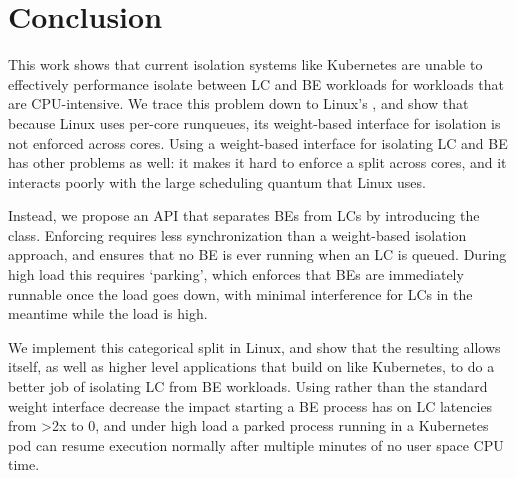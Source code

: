 \section{Conclusion}

This work shows that current isolation systems like Kubernetes are unable to
effectively performance isolate between LC and BE workloads for workloads that
are CPU-intensive. We trace this problem down to Linux's \cgroups{}, and show
that because Linux uses per-core runqueues, its weight-based interface for
isolation is not enforced across cores. Using a weight-based interface for
isolating LC and BE has other problems as well: it makes it hard to enforce a
split across cores, and it interacts poorly with the large scheduling quantum
that Linux uses.

Instead, we propose an API that separates BEs from LCs by introducing the
\beclass{} class. Enforcing \beclass{} requires less synchronization than a
weight-based isolation approach, and ensures that no BE is ever running when an
LC is queued. During high load this requires `parking', which enforces that BEs
are immediately runnable once the load goes down, with minimal interference for
LCs in the meantime while the load is high.

We implement this categorical split in Linux, and show that the resulting
\schedbe{} allows \cgroups{} itself, as well as higher level applications that
build on \cgroups{} like Kubernetes, to do a better job of isolating LC from BE
workloads. Using \schedbe{} rather than the standard \cgroups{} weight interface
decrease the impact starting a BE process has on LC latencies from >2x to 0, and
under high load a parked \schedbe{} process running in a Kubernetes pod can
resume execution normally after multiple minutes of no user space CPU time.


